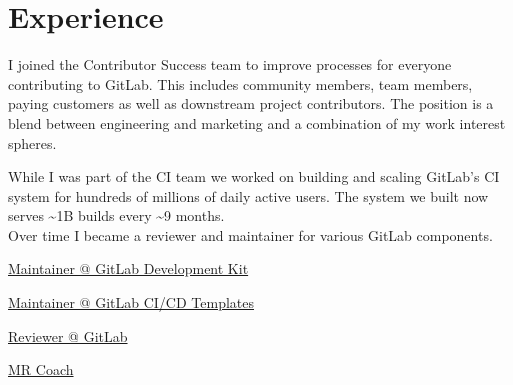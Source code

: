 \documentclass[]{matija-resume}
\begin{document}
\begin{minipage}[t]{1.0\textwidth}


\section{Experience}

\vspace{\topsep}
I joined the Contributor Success team to improve processes for everyone contributing to GitLab. This includes community members, team members, paying customers as well as downstream project contributors. The position is a blend between engineering and marketing and a combination of my work interest spheres.
\sectionsep

\vspace{\topsep}
While I was part of the CI team we worked on building and scaling GitLab's CI system for hundreds of millions of daily active users. The system we built now serves \textasciitilde 1B builds every \textasciitilde 9 months.\\
\vspace{\topsep}
Over time I became a reviewer and maintainer for various GitLab components.
\vspace{\topsep}
\begin{tightemize}
\item \href{https://gitlab.com/gitlab-org/gitlab-development-kit/}{Maintainer @ GitLab Development Kit }
\item \href{https://gitlab.com/gitlab-org/gitlab/}{Maintainer @ GitLab CI/CD Templates }
\item \href{https://gitlab.com/gitlab-org/gitlab/}{Reviewer @ GitLab }
\item \href{https://about.gitlab.com/job-families/expert/merge-request-coach/}{MR Coach }
\end{tightemize}


\end{minipage}
\end{document}
